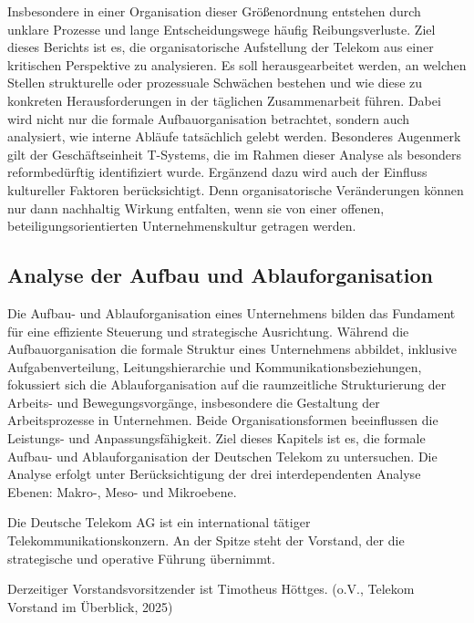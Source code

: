 \documentclass[12pt,a4paper]{article}
\begin{document}
	\noindent Insbesondere in einer Organisation dieser Größenordnung entstehen durch
	unklare Prozesse und lange Entscheidungswege häufig Reibungsverluste.
	Ziel dieses Berichts ist es, die organisatorische Aufstellung der
	Telekom aus einer kritischen Perspektive zu analysieren. Es soll
	herausgearbeitet werden, an welchen Stellen strukturelle oder
	prozessuale Schwächen bestehen und wie diese zu konkreten
	Herausforderungen in der täglichen Zusammenarbeit führen. Dabei wird
	nicht nur die formale Aufbauorganisation betrachtet, sondern auch
	analysiert, wie interne Abläufe tatsächlich gelebt werden. Besonderes
	Augenmerk gilt der Geschäftseinheit T-Systems, die im Rahmen dieser
	Analyse als besonders reformbedürftig identifiziert wurde. Ergänzend
	dazu wird auch der Einfluss kultureller Faktoren berücksichtigt. Denn
	organisatorische Veränderungen können nur dann nachhaltig Wirkung
	entfalten, wenn sie von einer offenen, beteiligungsorientierten
	Unternehmenskultur getragen werden.
	
	\subsection{\texorpdfstring{Analyse der Aufbau und Ablauforganisation}{Analyse der Aufbau und Ablauforganisation }}\label{analyse-der-aufbau-und-ablauforganisation}
	
	\noindent Die Aufbau- und Ablauforganisation eines Unternehmens bilden das
	Fundament für eine effiziente Steuerung und strategische Ausrichtung.
	Während die Aufbauorganisation die formale Struktur eines Unternehmens
	abbildet, inklusive Aufgabenverteilung, Leitungshierarchie und
	Kommunikationsbeziehungen, fokussiert sich die Ablauforganisation auf
	die raumzeitliche Strukturierung der Arbeits- und Bewegungsvorgänge,
	insbesondere die Gestaltung der Arbeitsprozesse in Unternehmen. Beide
	Organisationsformen beeinflussen die Leistungs- und Anpassungsfähigkeit.
	Ziel dieses Kapitels ist es, die formale Aufbau- und Ablauforganisation
	der Deutschen Telekom zu untersuchen. Die Analyse erfolgt unter
	Berücksichtigung der drei interdependenten Analyse Ebenen: Makro-, Meso-
	und Mikroebene.
	
	\noindent Die Deutsche Telekom AG ist ein international tätiger
	Telekommunikationskonzern. An der Spitze steht der Vorstand, der die
	strategische und operative Führung übernimmt.
	
	\noindent Derzeitiger Vorstandsvorsitzender ist Timotheus Höttges. (o.V., Telekom
	Vorstand im Überblick, 2025)
	
\end{document}
